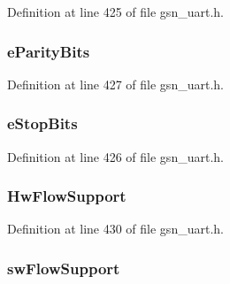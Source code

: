 Definition at line 425 of file gsn\_\-uart.h.

\hypertarget{a00268_ad502004530cedf0657a430de1786d925}{
\subsubsection[{eParityBits}]{ {\bf eParityBits}}}
\label{a00268_ad502004530cedf0657a430de1786d925}


Definition at line 427 of file gsn\_\-uart.h.

\hypertarget{a00268_a37d63083498fa8783003046b90f04949}{
\subsubsection[{eStopBits}]{ {\bf eStopBits}}}
\label{a00268_a37d63083498fa8783003046b90f04949}


Definition at line 426 of file gsn\_\-uart.h.

\hypertarget{a00268_afcdcf525c04f0b05dabb1816248b6bd9}{
\subsubsection[{HwFlowSupport}]{ {\bf HwFlowSupport}}}
\label{a00268_afcdcf525c04f0b05dabb1816248b6bd9}


Definition at line 430 of file gsn\_\-uart.h.

\hypertarget{a00268_aeb73ed49d5b7594525fafe0f0ff0590f}{
\subsubsection[{swFlowSupport}]{ {\bf swFlowSupport}}}
\label{a00268_aeb73ed49d5b7594525fafe0f0ff0590f}


